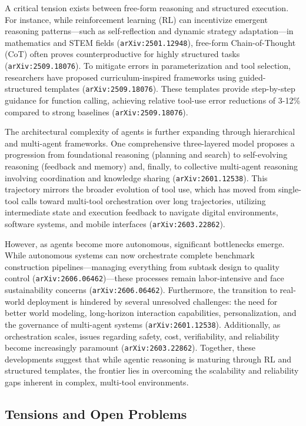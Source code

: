 \documentclass[11pt]{article}
\begin{document}
A critical tension exists between free-form reasoning and structured execution. For instance, while reinforcement learning (RL) can incentivize emergent reasoning patterns—such as self-reflection and dynamic strategy adaptation—in mathematics and STEM fields (\texttt{arXiv:2501.12948}), free-form Chain-of-Thought (CoT) often proves counterproductive for highly structured tasks (\texttt{arXiv:2509.18076}). To mitigate errors in parameterization and tool selection, researchers have proposed curriculum-inspired frameworks using guided-structured templates (\texttt{arXiv:2509.18076}). These templates provide step-by-step guidance for function calling, achieving relative tool-use error reductions of 3-12\% compared to strong baselines (\texttt{arXiv:2509.18076}).

The architectural complexity of agents is further expanding through hierarchical and multi-agent frameworks. One comprehensive three-layered model proposes a progression from foundational reasoning (planning and search) to self-evolving reasoning (feedback and memory) and, finally, to collective multi-agent reasoning involving coordination and knowledge sharing (\texttt{arXiv:2601.12538}). This trajectory mirrors the broader evolution of tool use, which has moved from single-tool calls toward multi-tool orchestration over long trajectories, utilizing intermediate state and execution feedback to navigate digital environments, software systems, and mobile interfaces (\texttt{arXiv:2603.22862}).

However, as agents become more autonomous, significant bottlenecks emerge. While autonomous systems can now orchestrate complete benchmark construction pipelines—managing everything from subtask design to quality control (\texttt{arXiv:2606.06462})—these processes remain labor-intensive and face sustainability concerns (\texttt{arXiv:2606.06462}). Furthermore, the transition to real-world deployment is hindered by several unresolved challenges: the need for better world modeling, long-horizon interaction capabilities, personalization, and the governance of multi-agent systems (\texttt{arXiv:2601.12538}). Additionally, as orchestration scales, issues regarding safety, cost, verifiability, and reliability become increasingly paramount (\texttt{arXiv:2603.22862}). Together, these developments suggest that while agentic reasoning is maturing through RL and structured templates, the frontier lies in overcoming the scalability and reliability gaps inherent in complex, multi-tool environments.

\subsection{Tensions and Open Problems}
\end{document}
